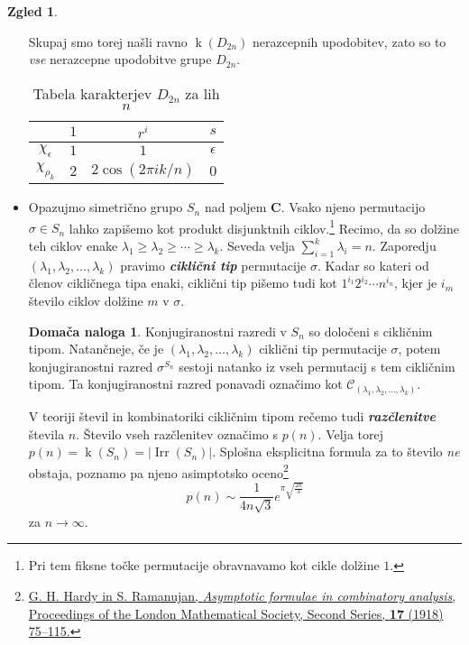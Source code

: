 \documentclass[11pt]{book}
\def\CC{\mathbf{C}}
\def\conclass{\mathcal{C}}
\DeclareMathOperator\Irr{Irr}
\DeclareMathOperator\kk{k}
\def\definicija{\color{rdeca}\bf\em}
\theoremstyle{definition}
\theoremstyle{zgled}
\newtheorem*{zgled}{Zgled}
\theoremstyle{odprtproblem}
\theoremstyle{domacanaloga}
\newtheorem*{domacanaloga}{Domača naloga}
\theoremstyle{izrek}
\begin{document}
\begin{zgled}
\begin{itemize}
Skupaj smo torej našli ravno $\kk(D_{2n})$ nerazcepnih upodobitev, zato so to \emph{vse} nerazcepne upodobitve grupe $D_{2n}$.

\begin{table}[t]
    \centering
\begin{tabular}{c|ccc}
    & $1$ & $r^i$ & $s$ \\ \hline
    $\chi_{\epsilon}$ & $1$ & $1$ & $\epsilon$ \\
    $\chi_{\rho_k}$ & $2$ & $2 \cos(2 \pi i k / n)$ & $0$ \\
\end{tabular}
\caption{Tabela karakterjev $D_{2n}$ za lih $n$}
\end{table}

\item Opazujmo simetrično grupo $S_n$ nad poljem $\CC$. Vsako njeno permutacijo $\sigma \in S_n$ lahko zapišemo kot produkt disjunktnih ciklov.\footnote{Pri tem fiksne točke permutacije obravnavamo kot cikle dolžine $1$.} Recimo, da so dolžine teh ciklov enake $\lambda_1 \geq \lambda_2 \geq \cdots \geq \lambda_{k}$. Seveda velja $\sum_{i = 1}^{k} \lambda_i = n$. Zaporedju $(\lambda_1, \lambda_2, \dots, \lambda_{k})$ pravimo {\definicija ciklični tip} permutacije $\sigma$. Kadar so kateri od členov cikličnega tipa enaki, ciklični tip pišemo tudi kot $1^{i_1} 2^{i_2} \cdots n^{i_n}$, kjer je $i_m$ število ciklov dolžine $m$ v $\sigma$.

\begin{domacanaloga}
Konjugiranostni razredi v $S_n$ so določeni s cikličnim tipom. Natančneje, če je $(\lambda_1, \lambda_2, \dots, \lambda_{k})$ ciklični tip permutacije $\sigma$, potem konjugiranostni razred $\sigma^{S_n}$ sestoji natanko iz vseh permutacij s tem cikličnim tipom. Ta konjugiranostni razred ponavadi označimo kot $\conclass_{(\lambda_1, \lambda_2, \dots, \lambda_k)}$.
\end{domacanaloga}

V teoriji števil in kombinatoriki cikličnim tipom rečemo tudi {\definicija razčlenitve} števila $n$. Število vseh razčlenitev označimo s $p(n)$. Velja torej $p(n) = \kk(S_n) = |\Irr(S_n)|$. Splošna eksplicitna formula za to število \emph{ne} obstaja, poznamo pa njeno asimptotsko oceno\footnote{\href{https://academic.oup.com/plms/article-abstract/s2-17/1/75/1536632?redirectedFrom=PDF}{G. H. Hardy in S. Ramanujan, \emph{Asymptotic formulae in combinatory analysis}, Proceedings of the London Mathematical Society, Second Series, \textbf{17} (1918) 75--115.}}
\[
    p(n) \sim \frac{1}{4 n \sqrt{3}} e^{\pi \sqrt{\frac{2n}{3}}}
\]
za $n \to \infty$. 


\end{itemize}
\end{zgled}
\end{document}
